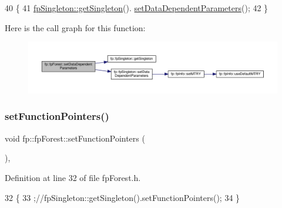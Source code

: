 \begin{DoxyCode}
40                                                     \{
41                 \hyperlink{classfp_1_1fpSingleton_a8bdae77b68521003e3fc630edec2e240}{fpSingleton::getSingleton}().
      \hyperlink{classfp_1_1fpSingleton_a3edf17209500e72c76ef816e32666eb2}{setDataDependentParameters}();
42             \}
\end{DoxyCode}
Here is the call graph for this function\+:
\nopagebreak
\begin{figure}[H]
\begin{center}
\leavevmode
\includegraphics[width=350pt]{classfp_1_1fpForest_a846818c46a4423f668f19d3493864192_cgraph}
\end{center}
\end{figure}
\mbox{\label{classfp_1_1fpForest_ab25fdbad494f8bd358ccb3a1fdbcb51d}} 
\subsubsection{\texorpdfstring{set\+Function\+Pointers()}{setFunctionPointers()}}
{\footnotesize\ttfamily void fp\+::fp\+Forest\+::set\+Function\+Pointers (\begin{DoxyParamCaption}{ }\end{DoxyParamCaption})\hspace{0.3cm}{\ttfamily [inline]}, {\ttfamily [protected]}}



Definition at line 32 of file fp\+Forest.\+h.


\begin{DoxyCode}
32                                              \{
33                 ;\textcolor{comment}{//fpSingleton::getSingleton().setFunctionPointers();}
34             \}
\end{DoxyCode}
\mbox{\label{classfp_1_1fpForest_ad13bbbd33291ef5f523691eccc23aece}} 

